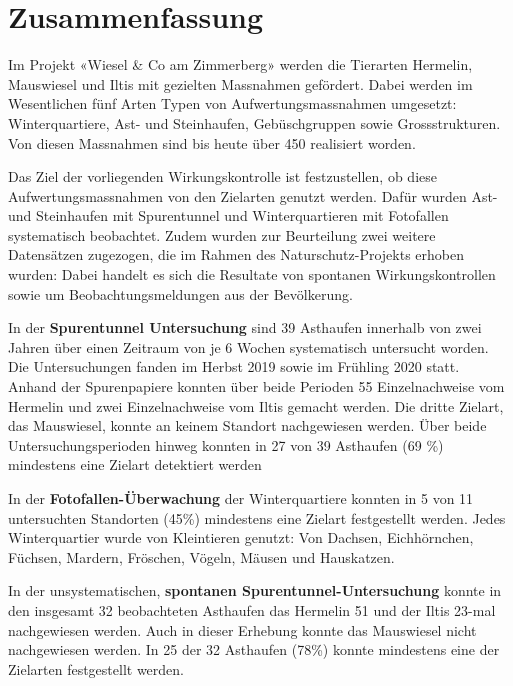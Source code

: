 \documentclass[
  oneside]{scrbook}
\let\oldmaketitle\maketitle
\begin{document}
\let\maketitle\oldmaketitle



{
\setcounter{tocdepth}{1}
\tableofcontents
}
\hypertarget{zusammenfassung}{%
\chapter{Zusammenfassung}\label{zusammenfassung}}

Im Projekt «Wiesel \& Co am Zimmerberg» werden die Tierarten Hermelin, Mauswiesel und Iltis mit gezielten Massnahmen gefördert. Dabei werden im Wesentlichen fünf Arten Typen von Aufwertungsmassnahmen umgesetzt: Winterquartiere, Ast- und Steinhaufen, Gebüschgruppen sowie Grossstrukturen. Von diesen Massnahmen sind bis heute über 450 realisiert worden.

Das Ziel der vorliegenden Wirkungskontrolle ist festzustellen, ob diese Aufwertungsmassnahmen von den Zielarten genutzt werden. Dafür wurden Ast- und Steinhaufen mit Spurentunnel und Winterquartieren mit Fotofallen systematisch beobachtet. Zudem wurden zur Beurteilung zwei weitere Datensätzen zugezogen, die im Rahmen des Naturschutz-Projekts erhoben wurden: Dabei handelt es sich die Resultate von spontanen Wirkungskontrollen sowie um Beobachtungsmeldungen aus der Bevölkerung.

In der \textbf{Spurentunnel Untersuchung} sind 39 Asthaufen innerhalb von zwei Jahren über einen Zeitraum von je 6 Wochen systematisch untersucht worden. Die Untersuchungen fanden im Herbst 2019 sowie im Frühling 2020 statt. Anhand der Spurenpapiere konnten über beide Perioden 55 Einzelnachweise vom Hermelin und zwei Einzelnachweise vom Iltis gemacht werden. Die dritte Zielart, das Mauswiesel, konnte an keinem Standort nachgewiesen werden. Über beide Untersuchungsperioden hinweg konnten in 27 von 39 Asthaufen (69 \%) mindestens eine Zielart detektiert werden

In der \textbf{Fotofallen-Überwachung} der Winterquartiere konnten in 5 von 11 untersuchten Standorten (45\%) mindestens eine Zielart festgestellt werden. Jedes Winterquartier wurde von Kleintieren genutzt: Von Dachsen, Eichhörnchen, Füchsen, Mardern, Fröschen, Vögeln, Mäusen und Hauskatzen.

In der unsystematischen, \textbf{spontanen Spurentunnel-Untersuchung} konnte in den insgesamt 32 beobachteten Asthaufen das Hermelin 51 und der Iltis 23-mal nachgewiesen werden. Auch in dieser Erhebung konnte das Mauswiesel nicht nachgewiesen werden. In 25 der 32 Asthaufen (78\%) konnte mindestens eine der Zielarten festgestellt werden.
\end{document}
